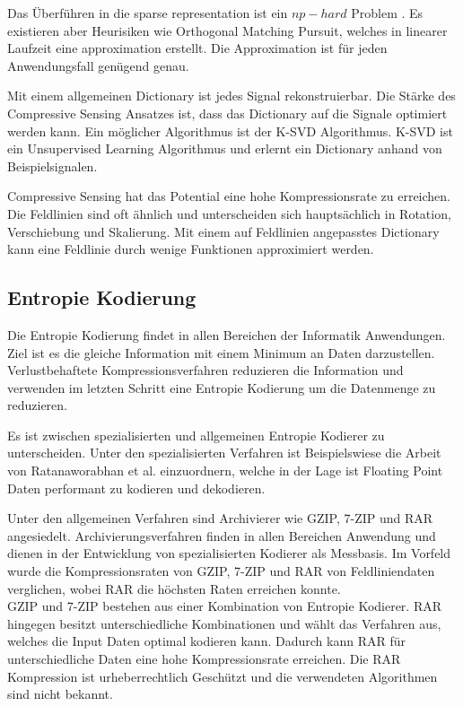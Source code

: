 Das Überführen in die sparse representation ist ein $np-hard$ Problem \cite{wiki:npHard}. Es existieren aber Heurisiken wie Orthogonal Matching Pursuit\cite{tropp2007signal}, welches in linearer Laufzeit eine approximation erstellt. Die Approximation ist für jeden Anwendungsfall genügend genau.

Mit einem allgemeinen Dictionary ist jedes Signal rekonstruierbar. Die Stärke des Compressive Sensing Ansatzes ist, dass das Dictionary auf die Signale optimiert werden kann. Ein möglicher Algorithmus ist der K-SVD \cite{bryt2008compression} Algorithmus. K-SVD ist ein Unsupervised Learning Algorithmus und erlernt ein Dictionary anhand von Beispielsignalen.

Compressive Sensing hat das Potential eine hohe Kompressionsrate zu erreichen. Die Feldlinien sind oft ähnlich und unterscheiden sich hauptsächlich in Rotation, Verschiebung und Skalierung. Mit einem auf Feldlinien angepasstes Dictionary kann eine Feldlinie durch wenige Funktionen approximiert werden.

\subsection{Entropie Kodierung}
Die Entropie Kodierung findet in allen Bereichen der Informatik Anwendungen. Ziel ist es die gleiche Information mit einem Minimum an Daten darzustellen. Verlustbehaftete Kompressionsverfahren reduzieren die Information und verwenden im letzten Schritt eine Entropie Kodierung um die Datenmenge zu reduzieren.

Es ist zwischen spezialisierten und allgemeinen Entropie Kodierer zu unterscheiden. Unter den spezialisierten Verfahren ist Beispielswiese die Arbeit von Ratanaworabhan et al.\cite{ratanaworabhan2006fast} einzuordnern, welche in der Lage ist Floating Point Daten performant zu kodieren und dekodieren.
 
Unter den allgemeinen Verfahren sind Archivierer wie GZIP\cite{website:gzip}, 7-ZIP\cite{website:7zip} und RAR\cite{website:rar} angesiedelt. Archivierungsverfahren finden in allen Bereichen Anwendung und dienen in der Entwicklung von spezialisierten Kodierer als Messbasis. Im Vorfeld wurde die Kompressionsraten von GZIP, 7-ZIP und RAR von Feldliniendaten verglichen, wobei RAR die höchsten Raten erreichen konnte.\\
GZIP und 7-ZIP bestehen aus einer Kombination von Entropie Kodierer. RAR hingegen besitzt unterschiedliche Kombinationen und wählt das Verfahren aus, welches die Input Daten optimal kodieren kann. Dadurch kann RAR für unterschiedliche Daten eine hohe Kompressionsrate erreichen. Die RAR Kompression ist urheberrechtlich Geschützt und die verwendeten Algorithmen sind nicht bekannt.